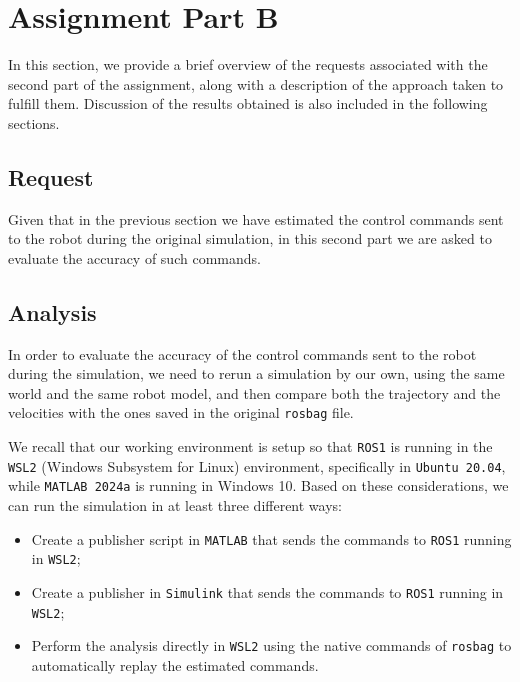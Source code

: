 \section{Assignment Part B}
\label{sec:assignment_part_B}

In this section, we provide a brief overview of the requests associated with the second part of the assignment, along with a description of the approach taken to fulfill them.
Discussion of the results obtained is also included in the following sections.


\subsection{Request}
\label{subsec:request_part_B}

Given that in the previous section we have estimated the control commands sent to the robot during the original simulation, in this second part we are asked to evaluate the accuracy of such commands.



\subsection{Analysis}
\label{subsec:analysis_part_B}

In order to evaluate the accuracy of the control commands sent to the robot during the simulation, we need to rerun a simulation by our own, using the same world and the same robot model, and then compare both the trajectory and the velocities with the ones saved in the original \texttt{rosbag} file.

We recall that our working environment is setup so that \texttt{ROS1} is running in the \texttt{WSL2} (Windows Subsystem for Linux) environment, specifically in \texttt{Ubuntu 20.04}, while \texttt{MATLAB 2024a} is running in Windows 10.
Based on these considerations, we can run the simulation in at least three different ways:

\begin{itemize}
    \item Create a publisher script in \texttt{MATLAB} that sends the commands to \texttt{ROS1} running in \texttt{WSL2};
    \item Create a publisher in \texttt{Simulink} that sends the commands to \texttt{ROS1} running in \texttt{WSL2};
    \item Perform the analysis directly in \texttt{WSL2} using the native commands of \texttt{rosbag} to automatically replay the estimated commands.
\end{itemize}

